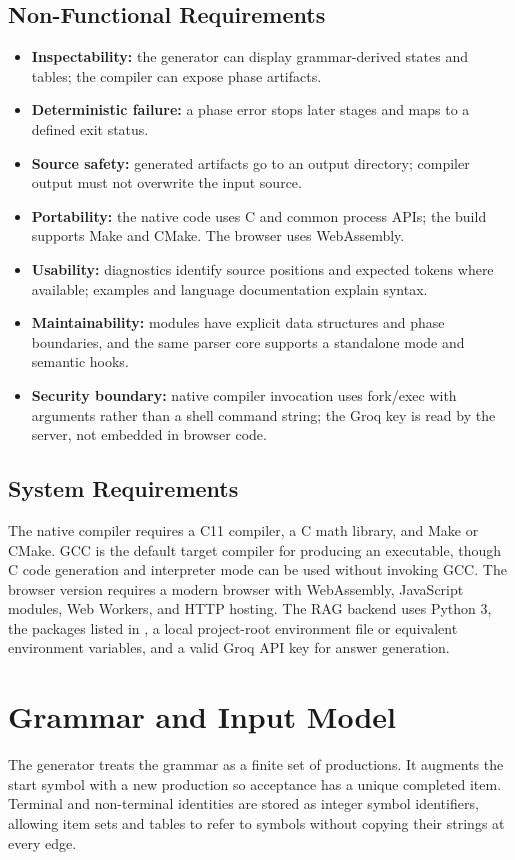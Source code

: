 \documentclass[12pt,a4paper,oneside]{report}
\newcommand{\code}[1]{\texttt{\detokenize{#1}}}
\begin{document}
\subsection{Non-Functional Requirements}
\begin{itemize}
\item \textbf{Inspectability:} the generator can display grammar-derived states and tables; the compiler can expose phase artifacts.
\item \textbf{Deterministic failure:} a phase error stops later stages and maps to a defined exit status.
\item \textbf{Source safety:} generated artifacts go to an output directory; compiler output must not overwrite the input source.
\item \textbf{Portability:} the native code uses C and common process APIs; the build supports Make and CMake. The browser uses WebAssembly.
\item \textbf{Usability:} diagnostics identify source positions and expected tokens where available; examples and language documentation explain syntax.
\item \textbf{Maintainability:} modules have explicit data structures and phase boundaries, and the same parser core supports a standalone mode and semantic hooks.
\item \textbf{Security boundary:} native compiler invocation uses fork/exec with arguments rather than a shell command string; the Groq key is read by the server, not embedded in browser code.
\end{itemize}

\subsection{System Requirements}
The native compiler requires a C11 compiler, a C math library, and Make or CMake. GCC is the default target compiler for producing an executable, though C code generation and interpreter mode can be used without invoking GCC. The browser version requires a modern browser with WebAssembly, JavaScript modules, Web Workers, and HTTP hosting. The RAG backend uses Python 3, the packages listed in \code{requirements.txt}, a local project-root environment file or equivalent environment variables, and a valid Groq API key for answer generation.

\section{Grammar and Input Model}
The generator treats the grammar as a finite set of productions. It augments the start symbol with a new production so acceptance has a unique completed item. Terminal and non-terminal identities are stored as integer symbol identifiers, allowing item sets and tables to refer to symbols without copying their strings at every edge.
\end{document}
